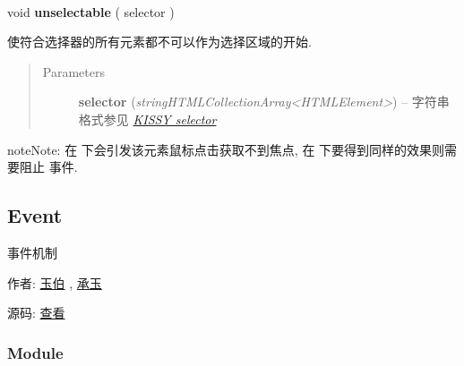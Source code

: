 \documentclass[letterpaper,10pt,english]{sphinxmanual}
\begin{document}
\begin{fulllineitems}
\label{api/core/dom/unselectable:DOM.unselectable}~
\begin{DUlineblock}{0em}
\item[] void \textbf{unselectable} ( selector )
\item[] 使符合选择器的所有元素都不可以作为选择区域的开始.
\end{DUlineblock}
\begin{quote}\begin{description}
\item[{Parameters}] \leavevmode
\textbf{selector} (\emph{string\textbar{}HTMLCollection\textbar{}Array\textless{}HTMLElement\textgreater{}}) -- 字符串格式参见 {\hyperref[api/core/dom/selector:dom-selector]{\emph{KISSY selector}}}

\end{description}\end{quote}

\begin{notice}{note}{Note:}
在  下会引发该元素鼠标点击获取不到焦点, 在  下要得到同样的效果则需要阻止  事件.
\end{notice}

\end{fulllineitems}

\label{api/core/event/index:module-Event}

\subsection{Event}
\label{api/core/event/index::doc}\label{api/core/event/index:event}
\begin{DUlineblock}{0em}
\item[] 事件机制
\item[] 作者: \href{mailto:lifesinger@gmail.com}{玉伯} , \href{mailto:yiminghe@gmail.com}{承玉}
\item[] 源码: \href{https://github.com/kissyteam/kissy/tree/master/src/event}{查看}
\end{DUlineblock}


\subsubsection{Module}
\label{api/core/event/index:module}\begin{quote}

{\hyperref[api/core/event/index:module-Event]{}}
\end{quote}
\end{document}
